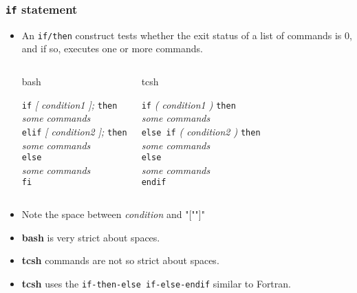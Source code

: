 \documentclass[slidestop,mathserif,compress,xcolor=svgnames]{beamer}
\newenvironment{bblock}[0]
{
\begin{beamerboxesrounded}[upper=uppercol1,lower=lowercol1,shadow=true]}
{\end{beamerboxesrounded}}
\newenvironment{eblock}[0]
{
\begin{beamerboxesrounded}[upper=uppercol2,lower=lowercol2,shadow=true]}
{\end{beamerboxesrounded}}
\begin{document}
\begin{frame}
  \frametitle{\small \texttt{if} statement}
  \begin{itemize}
    \item An \texttt{if/then} construct tests whether the exit status of a list of commands is 0, and if so, executes one or more commands.
    \begin{columns}
      \column{5cm}
      \begin{eblock}{bash}
        \begin{tabbing}
          \texttt{if} \=\textit{[ condition1 ]; } \texttt{then}\\
          \> \textit{some commands}\\
          \texttt{elif} \textit{ [ condition2 ]; } \texttt{then}\\
          \> \textit{some commands}\\
          \texttt{else}\\
          \> \textit{some commands}\\
          \texttt{fi}
        \end{tabbing}
      \end{eblock}
      \column{5cm}
      \begin{bblock}{tcsh}
        \begin{tabbing}
          \texttt{if} \=\textit{( condition1 ) } \texttt{then}\\
          \> \textit{some commands}\\
          \texttt{else if} \textit{ ( condition2 ) } \texttt{then}\\
          \> \textit{some commands}\\
          \texttt{else}\\
          \> \textit{some commands}\\
          \texttt{endif}
        \end{tabbing}
      \end{bblock}
    \end{columns}
  \item Note the space between \textit{condition} and "["\quad"]"
  \item \textbf{bash} is very strict about spaces.
  \item \textbf{tcsh} commands are not so strict about spaces.
  \item \textbf{tcsh} uses the \texttt{if-then-else if-else-endif} similar to Fortran.   
  \end{itemize}
\end{frame}
\end{document}
